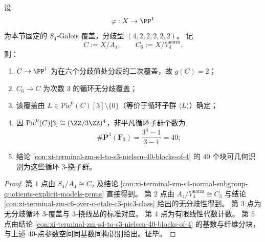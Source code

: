 \begin{conclusion}\label{con:xi-terminal-zm-40-blocks-equal-cyclic-3torsion-subgroups}
设
\[
\varphi:X\to\PP^1
\]
为本节固定的 \(S_4\)-Galois 覆盖，分歧型 \((4,2,2,2,2,2)\)。
记
\[
C:=X/A_4,\qquad C_6:=X/V_4^{\mathrm{norm}}.
\]
则：
\begin{enumerate}
  \item \(C\to\PP^1\) 为在六个分歧值处分歧的二次覆盖，故 \(g(C)=2\)；
  \item \(C_6\to C\) 为次数 \(3\) 的循环无分歧覆盖；
  \item 该覆盖由 \(L\in \mathrm{Pic}^0(C)[3]\setminus\{0\}\)（等价于循环子群 \(\langle L\rangle\)）确定；
  \item 因 \(\mathrm{Pic}^0(C)[3]\cong (\ZZ/3\ZZ)^4\)，非平凡循环子群个数为
  \[
  \#\mathbf P^3(\mathbf F_3)=\frac{3^4-1}{3-1}=40;
  \]
  \item 结论 \ref{con:xi-terminal-zm-s4-to-s3-nielsen-40-blocks-of-4} 的 \(40\) 个块可几何识别为这些循环 \(3\)-挠子群。
\end{enumerate}
\end{conclusion}
\begin{proof}
第 \(1\) 点由 \(S_4/A_4\cong C_2\) 及结论
\ref{con:xi-terminal-zm-s4-normal-subgroup-quotients-explicit-models-genus}
直接得到。
第 \(2\) 点由 \(A_4/V_4^{\mathrm{norm}}\cong C_3\) 与结论
\ref{con:xi-terminal-zm-c6-over-c-etale-c3-pic3-class}
给出的无分歧性得到。
第 \(3\) 点为无分歧循环 \(3\)-覆盖与 \(3\)-挠线丛的标准对应。
第 \(4\) 点为有限线性代数计数。
第 \(5\) 点由结论 \ref{con:xi-terminal-zm-s4-to-s3-nielsen-40-blocks-of-4} 的基数与纤维分块，与上述 \(40\)-点参数空间同基数同构识别给出。证毕。
\end{proof}

